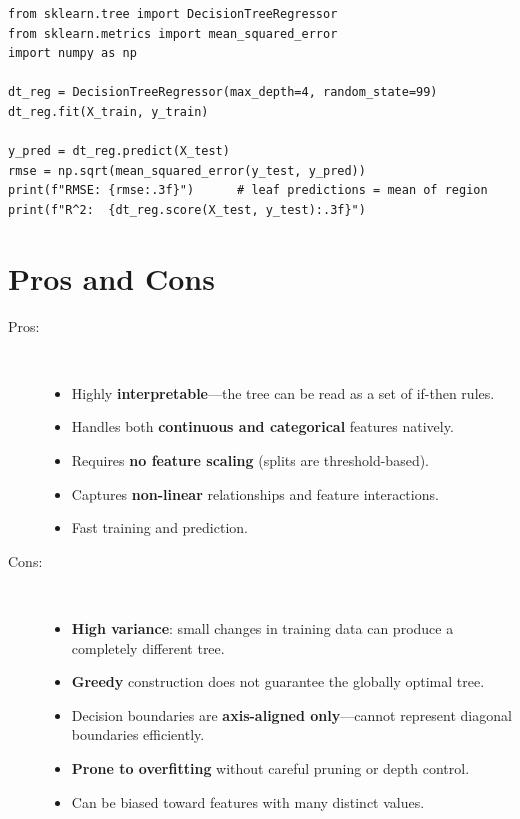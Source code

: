 \begin{lstlisting}[style=pythonstyle]
from sklearn.tree import DecisionTreeRegressor
from sklearn.metrics import mean_squared_error
import numpy as np

dt_reg = DecisionTreeRegressor(max_depth=4, random_state=99)
dt_reg.fit(X_train, y_train)

y_pred = dt_reg.predict(X_test)
rmse = np.sqrt(mean_squared_error(y_test, y_pred))
print(f"RMSE: {rmse:.3f}")      # leaf predictions = mean of region
print(f"R^2:  {dt_reg.score(X_test, y_test):.3f}")
\end{lstlisting}

\section*{Pros and Cons}

\begin{description}
    \item[Pros:]~
    \begin{itemize}
        \item Highly \textbf{interpretable}---the tree can be read as a set of if-then rules.
        \item Handles both \textbf{continuous and categorical} features natively.
        \item Requires \textbf{no feature scaling} (splits are threshold-based).
        \item Captures \textbf{non-linear} relationships and feature interactions.
        \item Fast training and prediction.
    \end{itemize}
    \item[Cons:]~
    \begin{itemize}
        \item \textbf{High variance}: small changes in training data can produce a completely different tree.
        \item \textbf{Greedy} construction does not guarantee the globally optimal tree.
        \item Decision boundaries are \textbf{axis-aligned only}---cannot represent diagonal boundaries efficiently.
        \item \textbf{Prone to overfitting} without careful pruning or depth control.
        \item Can be biased toward features with many distinct values.
    \end{itemize}
\end{description}

